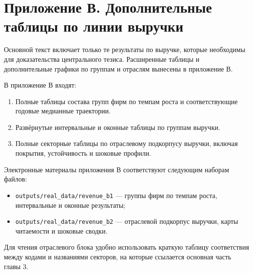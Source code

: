 \chapter{Приложение В. Дополнительные таблицы по линии выручки}
\label{app:prilozhenie-v-dopolnitelnye-tablitsy-po-linii-vyruchki}

Основной текст включает только те результаты по выручке, которые необходимы для доказательства центрального тезиса. Расширенные таблицы и дополнительные графики по группам и отраслям вынесены в приложение В.

В приложение В входят:

\begin{enumerate}
\def\labelenumi{\arabic{enumi}.}
\tightlist
\item
  Полные таблицы состава групп фирм по темпам роста и соответствующие годовые медианные траектории.
\item
  Развёрнутые интервальные и оконные таблицы по группам выручки.
\item
  Полные секторные таблицы по отраслевому подкорпусу выручки, включая покрытия, устойчивость и шоковые профили.
\end{enumerate}

Электронные материалы приложения В соответствуют следующим наборам файлов:

\begin{itemize}
\tightlist
\item
  \texttt{outputs/real\_data/revenue\_b1} --- группы фирм по темпам роста, интервальные и оконные результаты;
\item
  \texttt{outputs/real\_data/revenue\_b2} --- отраслевой подкорпус выручки, карты читаемости и шоковые сводки.
\end{itemize}

Для чтения отраслевого блока удобно использовать краткую таблицу соответствия между кодами и названиями секторов, на которые ссылается основная часть главы 3.


